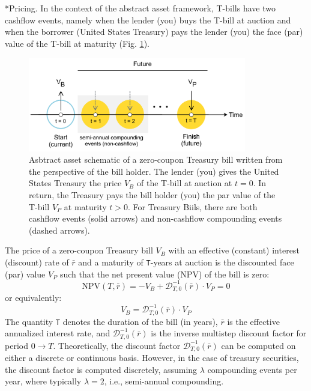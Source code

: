 \documentclass[11pt]{article}
\makeatletter
\theoremstyle{definition}
\renewcommand\subsubsection{\@startsection
	{subsubsection}{2}{0mm}
	{-0.05in}
	{-0.5\baselineskip}
	{\normalfont\normalsize\itshape\bfseries}}
\makeatother
\begin{document}
\subsubsection*{Pricing.}
In the context of the abstract asset framework, T-bills have two cashflow events, namely when the lender (you) buys the T-bill at auction 
and when the borrower (United States Treasury) pays the lender (you) the face (par) value of the T-bill at maturity (Fig. \ref{fig:t-bill-schematic}).
\begin{figure}[h]
    \centering
    \includegraphics[width=0.85\textwidth]{./figs/Fig-Bill-Asset-Timeline-Schematic.pdf}
    \caption{Asbtract asset schematic of a zero-coupon Treasury bill written from the perspective of the bill holder. The lender (you) gives the United States Treasury 
    the price $V_{B}$ of the T-bill at auction at $ t = 0$. In return, the Treasury pays the bill holder (you) the par value of the T-bill $V_{P}$ at maturity $t>0$. 
	For Treasury Biils, there are both cashflow events (solid arrows) and non-cashflow compounding events (dashed arrows).}\label{fig:t-bill-schematic}
\end{figure}
The price of a zero-coupon Treasury bill $V_{B}$ with an effective (constant) interest (discount) rate of $\bar{r}$ and a maturity of \texttt{T}-years at auction 
is the discounted face (par) value $V_{P}$ such that the net present value (NPV) of the bill is zero:
\begin{equation}    
\text{NPV}(T,\bar{r}) = -V_{B} + \mathcal{D}_{T,0}^{-1}(\bar{r})\cdot{V_{P}} = 0
\end{equation}
or equivalently:
\begin{equation}\label{eq:zero-coupon-treasury-bill-price}
    V_{B} = \mathcal{D}_{T,0}^{-1}(\bar{r})\cdot{V_{P}}
\end{equation}
The quantity \texttt{T} denotes the duration of the bill (in years), 
$\bar{r}$ is the effective annualized interest rate,  and $\mathcal{D}_{T,0}^{-1}(\bar{r})$ is the inverse multistep discount factor
for period $0\rightarrow{T}$. 
Theoretically, the discount factor $\mathcal{D}_{T,0}^{-1}(\bar{r})$ can be computed on either a discrete or continuous basis. 
However, in the case of treasury securities, the discount factor is computed discretely, assuming $\lambda$ compounding events per year, 
where typically $\lambda = 2$, i.e., semi-annual compounding.
\end{document}
